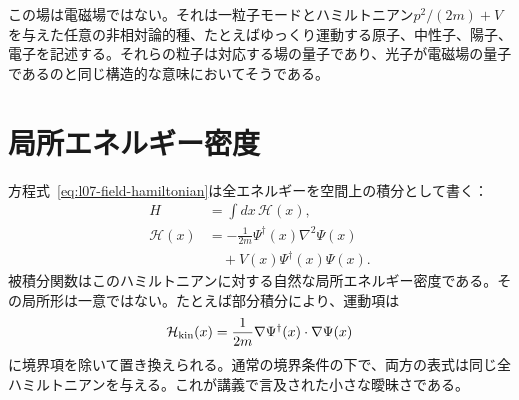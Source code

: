 この場は電磁場ではない。それは一粒子モードとハミルトニアン\(p^2/(2m)+V\)を与えた任意の非相対論的種、たとえばゆっくり運動する原子、中性子、陽子、電子を記述する。それらの粒子は対応する場の量子であり、光子が電磁場の量子であるのと同じ構造的な意味においてそうである。

\begin{classroomqa}
\end{classroomqa}

\section{局所エネルギー密度}

方程式~\eqref{eq:l07-field-hamiltonian}は全エネルギーを空間上の積分として書く：
\begin{equation}
\begin{aligned}
H&=\int dx\,\mathcal H(x),\\
\mathcal H(x)
&=-\frac{1}{2m}\Psi^\dagger(x)\nabla^2\Psi(x)\\
&\quad+V(x)\Psi^\dagger(x)\Psi(x).
\end{aligned}
\label{eq:l07-hamiltonian-density}
\end{equation}
被積分関数はこのハミルトニアンに対する自然な局所エネルギー密度である。その局所形は一意ではない。たとえば部分積分により、運動項は
\begin{equation}
\mathcal H_{\rm kin}(x)
=\frac{1}{2m}\nabla\Psi^\dagger(x)\mathbin{\cdot}\nabla\Psi(x)
\label{eq:l07-kinetic-density}
\end{equation}
に境界項を除いて置き換えられる。通常の境界条件の下で、両方の表式は同じ全ハミルトニアンを与える。これが講義で言及された小さな曖昧さである。

\begin{classroomqa}
\end{classroomqa}

